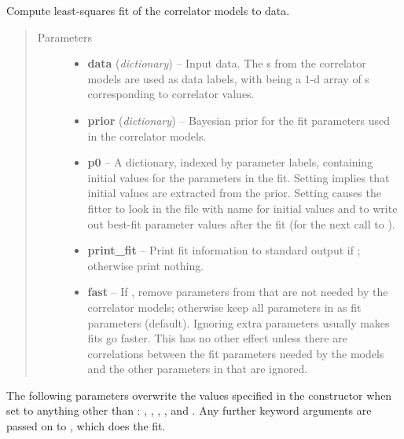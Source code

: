 \documentclass[letterpaper,10pt,english]{sphinxmanual}
\begin{document}
\begin{fulllineitems}
\begin{fulllineitems}
\label{corrfitter:corrfitter.CorrFitter.lsqfit}
Compute least-squares fit of the correlator models to data.
\begin{quote}\begin{description}
\item[{Parameters}] \leavevmode\begin{itemize}
\item {} 
\textbf{data} (\emph{dictionary}) -- Input data. The s from the 
correlator models are used as data labels, with 
 being a 1-d array of s 
corresponding to correlator values.

\item {} 
\textbf{prior} (\emph{dictionary}) -- Bayesian prior for the fit parameters used in the 
correlator models.

\item {} 
\textbf{p0} -- A dictionary, indexed by parameter labels, containing 
initial values for the parameters in the fit. Setting
 implies that initial values are extracted from the
prior. Setting  causes the fitter to look in
the file with name  for initial values and to
write out best-fit parameter values after the fit (for the next
call to ).

\item {} 
\textbf{print\_fit} -- Print fit information to standard output if 
; otherwise print nothing.

\item {} 
\textbf{fast} -- If , remove parameters from  that are 
not needed by the correlator models; otherwise keep all 
parameters in  as fit parameters (default). 
Ignoring extra parameters usually makes fits go faster.
This has no other effect unless there are correlations between the 
fit parameters needed by the models and the other parameters in 
 that are ignored.

\end{itemize}

\end{description}\end{quote}

The following parameters overwrite the values specified in the
{\hyperref[corrfitter:corrfitter.CorrFitter]{}} constructor when set to anything other than :
, , , , and . Any
further keyword arguments are passed on to
, which does the fit.

\end{fulllineitems}


\end{fulllineitems}
\end{document}
